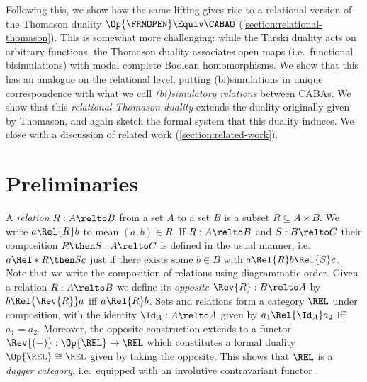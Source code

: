 \documentclass[10pt,a4paper]{article}
\begin{document}
Following this, we show how the same lifting gives rise to a relational version
of the Thomason duality $\Op{\FRMOPEN} \Equiv \CABAO$
(\cref{section:relational-thomason}). This is somewhat more challenging: while
the Tarski duality acts on arbitrary functions, the Thomason duality associates
open maps (i.e.\ functional bisimulations) with modal complete Boolean
homomorphisms. We show that this has an analogue on the relational level,
putting (bi)simulations in unique correspondence with what we call
\emph{(bi)simulatory relations} between CABAs. We show that this
\emph{relational Thomason duality} extends the duality originally given by
Thomason, and again sketch the formal system that this duality induces.
We close with a discussion of related work (\cref{section:related-work}).


\section{Preliminaries}\label{section:preliminaries}

A \emph{relation} $R : A \relto B$ from a set $A$ to a set $B$ is a subset $R
\subseteq A \times B$. We write $a \Rel{R} b$ to mean $(a, b) \in R$. If $R : A
\relto B$ and $S : B \relto C$ their composition $R \then S : A \relto C$ is
defined in the usual manner, i.e.\ $a \Rel*{R \then S} c$ just if there exists
some $b \in B$ with $a \Rel{R} b \Rel{S} c$. Note that we write the composition
of relations using diagrammatic order. Given a relation $R : A \relto B$ we
define its \emph{opposite} $\Rev{R} : B \relto A$ by $b \Rel{\Rev{R}} a$ iff $a
\Rel{R} b$. Sets and relations form a category $\REL$ under composition, with
the identity $\Id_A : A \relto A$ given by $a_1 \Rel{\Id_A} a_2$ iff $a_1 =
a_2$. Moreover, the opposite construction extends to a functor \(\Rev{(-)} :
\Op{\REL} \to \REL\) which constitutes a formal duality $\Op{\REL} \cong \REL$
given by taking the opposite. This shows that $\REL$ is a \emph{dagger
category}, i.e.\ equipped with an involutive contravariant functor \cite[\S
2.3.1]{heunen_2019}.
\end{document}
